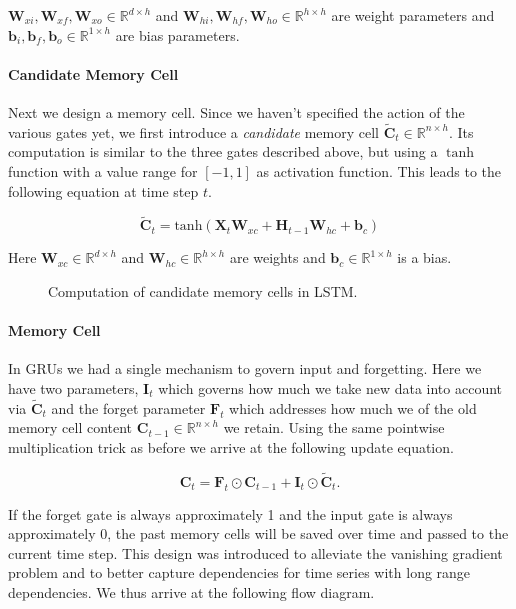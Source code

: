 $\mathbf{W}_{xi}, \mathbf{W}_{xf}, \mathbf{W}_{xo} \in \mathbb{R}^{d \times h}$ and $\mathbf{W}_{hi}, \mathbf{W}_{hf}, \mathbf{W}_{ho} \in \mathbb{R}^{h \times h}$ are weight parameters and $\mathbf{b}_i, \mathbf{b}_f, \mathbf{b}_o \in \mathbb{R}^{1 \times h}$ are bias parameters.

\paragraph{Candidate Memory Cell}

Next we design a memory cell. Since we haven't specified the action of the various gates yet, we first introduce a \textit{candidate} memory cell $\tilde{\mathbf{C}}_t \in \mathbb{R}^{n \times h}$. Its computation is similar to the three gates described above, but using a $\tanh$ function with a value range for $[-1, 1]$ as activation function. This leads to the following equation at time step $t$.

$$\tilde{\mathbf{C}}_t = \text{tanh}(\mathbf{X}_t \mathbf{W}_{xc} + \mathbf{H}_{t-1} \mathbf{W}_{hc} + \mathbf{b}_c)$$

Here $\mathbf{W}_{xc} \in \mathbb{R}^{d \times h}$ and $\mathbf{W}_{hc} \in \mathbb{R}^{h \times h}$ are weights and $\mathbf{b}_c \in \mathbb{R}^{1 \times h}$ is a bias.

\begin{figure}[hpt]
	\centering
	
	\caption{Computation of candidate memory cells in LSTM.}
	\label{fig:lstm_1}
\end{figure}


\paragraph{Memory Cell}

In GRUs we had a single mechanism to govern input and forgetting. Here we have two parameters, $\mathbf{I}_t$ which governs how much we take new data into account via $\tilde{\mathbf{C}}_t$ and the forget parameter $\mathbf{F}_t$ which addresses how much we of the old memory cell content $\mathbf{C}_{t-1} \in \mathbb{R}^{n \times h}$ we retain. Using the same pointwise multiplication trick as before we arrive at the following update equation.

$$\mathbf{C}_t = \mathbf{F}_t \odot \mathbf{C}_{t-1} + \mathbf{I}_t \odot \tilde{\mathbf{C}}_t.$$

If the forget gate is always approximately 1 and the input gate is always approximately 0, the past memory cells will be saved over time and passed to the current time step. This design was introduced to alleviate the vanishing gradient problem and to better capture dependencies for time series with long range dependencies. We thus arrive at the following flow diagram.

